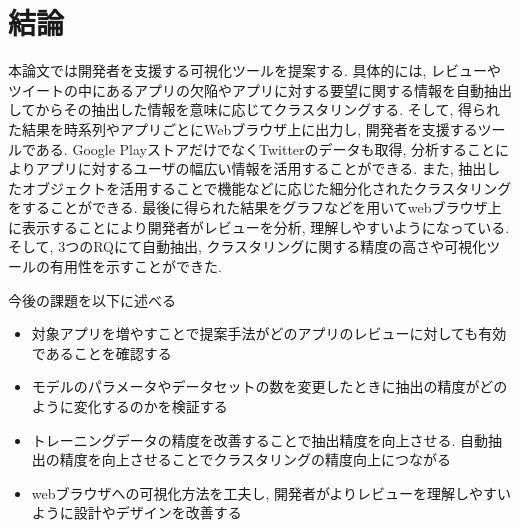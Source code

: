 \chapter{結論}
\label{chap:keturon}

本論文では開発者を支援する可視化ツールを提案する. 具体的には, レビューやツイートの中にあるアプリの欠陥やアプリに対する要望に関する情報を自動抽出してからその抽出した情報を意味に応じてクラスタリングする.  そして, 得られた結果を時系列やアプリごとにWebブラウザ上に出力し, 開発者を支援するツールである.
Google PlayストアだけでなくTwitterのデータも取得, 分析することによりアプリに対するユーザの幅広い情報を活用することができる. また, 抽出したオブジェクトを活用することで機能などに応じた細分化されたクラスタリングをすることができる. 最後に得られた結果をグラフなどを用いてwebブラウザ上に表示することにより開発者がレビューを分析, 理解しやすいようになっている. 
そして, 3つのRQにて自動抽出, クラスタリングに関する精度の高さや可視化ツールの有用性を示すことができた. 

今後の課題を以下に述べる

\begin{itemize}
    \item 対象アプリを増やすことで提案手法がどのアプリのレビューに対しても有効であることを確認する
    \item モデルのパラメータやデータセットの数を変更したときに抽出の精度がどのように変化するのかを検証する
    \item トレーニングデータの精度を改善することで抽出精度を向上させる. 自動抽出の精度を向上させることでクラスタリングの精度向上につながる
    \item webブラウザへの可視化方法を工夫し, 開発者がよりレビューを理解しやすいように設計やデザインを改善する
\end{itemize}
